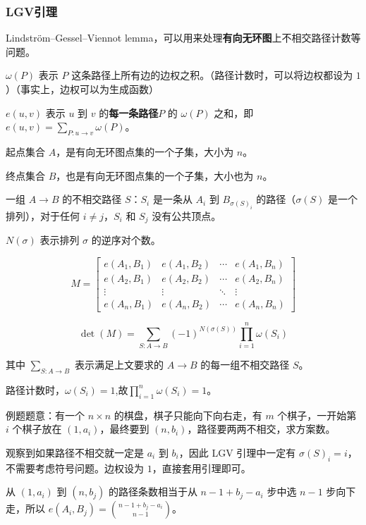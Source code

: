 \documentclass[UTF8]{ctexart}
\begin{document}
\subsubsection{LGV引理}
Lindström–Gessel–Viennot lemma，可以用来处理\textbf{有向无环图}上不相交路径计数等问题。

$\omega(P)$ 表示 $P$ 这条路径上所有边的边权之积。（路径计数时，可以将边权都设为 $1$）（事实上，边权可以为生成函数）

$e(u, v)$ 表示 $u$ 到 $v$ 的\textbf{每一条路径}$P$ 的 $\omega(P)$ 之和，即 $e(u, v)=\sum\limits_{P:u\rightarrow v}\omega(P)$。

起点集合 $A$，是有向无环图点集的一个子集，大小为 $n$。

终点集合 $B$，也是有向无环图点集的一个子集，大小也为 $n$。

一组 $A\rightarrow B$ 的不相交路径 $S$：$S_i$ 是一条从 $A_i$ 到 $B_{\sigma(S)_i}$ 的路径（$\sigma(S)$ 是一个排列），对于任何 $i\ne j$，$S_i$ 和 $S_j$ 没有公共顶点。

$N(\sigma)$ 表示排列 $\sigma$ 的逆序对个数。

$$
M = \begin{bmatrix}e(A_1,B_1)&e(A_1,B_2)&\cdots&e(A_1,B_n)\\
e(A_2,B_1)&e(A_2,B_2)&\cdots&e(A_2,B_n)\\
\vdots&\vdots&\ddots&\vdots\\
e(A_n,B_1)&e(A_n,B_2)&\cdots&e(A_n,B_n)\end{bmatrix}
$$

$$
\det(M)=\sum\limits_{S:A\rightarrow B}(-1)^{N(\sigma(S))}\prod\limits_{i=1}^n \omega(S_i)
$$

其中 $\sum\limits_{S:A\rightarrow B}$ 表示满足上文要求的 $A\rightarrow B$ 的每一组不相交路径 $S$。

路径计数时，$\omega(S_i)=1$,故$\prod\limits_{i=1}^n \omega(S_i)=1$。

例题题意：有一个 $n\times n$ 的棋盘，棋子只能向下向右走，有 $m$ 个棋子，一开始第 $i$ 个棋子放在 $(1, a_i)$，最终要到 $(n, b_i)$，路径要两两不相交，求方案数。


观察到如果路径不相交就一定是 $a_i$ 到 $b_i$，因此 LGV 引理中一定有 $\sigma(S)_i=i$，不需要考虑符号问题。边权设为 $1$，直接套用引理即可。

从 $(1, a_i)$ 到 $(n, b_j)$ 的路径条数相当于从 $n-1+b_j-a_i$ 步中选 $n-1$ 步向下走，所以 $e(A_i, B_j)=\binom{n-1+b_j-a_i}{n-1}$。
\end{document}
